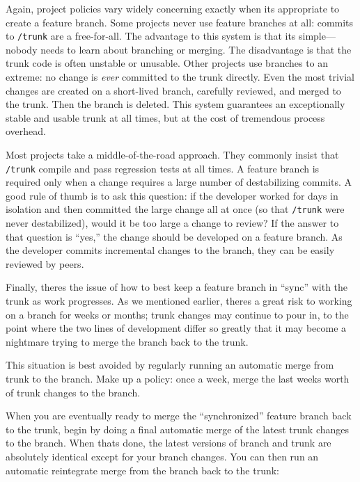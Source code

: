 Again, project policies vary widely concerning exactly when
it\textquotesingle s appropriate to create a feature branch. Some
projects never use feature branches at all: commits to \texttt{/trunk}
are a free-for-all. The advantage to this system is that
it\textquotesingle s simple---nobody needs to learn about branching or
merging. The disadvantage is that the trunk code is often unstable or
unusable. Other projects use branches to an extreme: no change is
\emph{ever} committed to the trunk directly. Even the most trivial
changes are created on a short-lived branch, carefully reviewed, and
merged to the trunk. Then the branch is deleted. This system guarantees
an exceptionally stable and usable trunk at all times, but at the cost
of tremendous process overhead.

Most projects take a middle-of-the-road approach. They commonly insist
that \texttt{/trunk} compile and pass regression tests at all times. A
feature branch is required only when a change requires a large number of
destabilizing commits. A good rule of thumb is to ask this question: if
the developer worked for days in isolation and then committed the large
change all at once (so that \texttt{/trunk} were never destabilized),
would it be too large a change to review? If the answer to that question
is ``yes,'' the change should be developed on a feature branch. As the
developer commits incremental changes to the branch, they can be easily
reviewed by peers.

Finally, there\textquotesingle s the issue of how to best keep a feature
branch in ``sync'' with the trunk as work progresses. As we mentioned
earlier, there\textquotesingle s a great risk to working on a branch for
weeks or months; trunk changes may continue to pour in, to the point
where the two lines of development differ so greatly that it may become
a nightmare trying to merge the branch back to the trunk.

This situation is best avoided by regularly running an automatic merge
from trunk to the branch. Make up a policy: once a week, merge the last
week\textquotesingle s worth of trunk changes to the branch.

When you are eventually ready to merge the ``synchronized'' feature
branch back to the trunk, begin by doing a final automatic merge of the
latest trunk changes to the branch. When that\textquotesingle s done,
the latest versions of branch and trunk are absolutely identical except
for your branch changes. You can then run an automatic reintegrate merge
from the branch back to the trunk:

